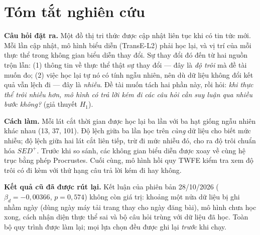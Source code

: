 \documentclass[12pt,a4paper,oneside]{report}
\makeatletter
\theoremstyle{definition}
\theoremstyle{plain}
\theoremstyle{remark}
\newif\if@mainmatter
\newcommand{\frontmatter}{%
    \cleardoublepage
    \@mainmatterfalse
    \pagenumbering{roman}
}
\makeatother
\begin{document}
\frontmatter

\chapter*{Tóm tắt nghiên cứu}
\textbf{Câu hỏi đặt ra.} Một đồ thị tri thức được cập nhật liên tục khi có tin tức mới. Mỗi lần cập nhật, mô hình biểu diễn (TransE-L2) phải học lại, và vị trí của mỗi thực thể trong không gian biểu diễn thay đổi. Sự thay đổi đó đến từ hai nguồn trộn lẫn: (1) thông tin về thực thể thật sự thay đổi --- đây là \textit{độ trôi} mà đề tài muốn đo; (2) việc học lại tự nó có tính ngẫu nhiên, nên dù dữ liệu không đổi kết quả vẫn lệch đi --- đây là \textit{nhiễu}. Đề tài muốn tách hai phần này, rồi hỏi: \textit{khi thực thể trôi nhiều hơn, mô hình có trả lời kém đi các câu hỏi cần suy luận qua nhiều bước không?} (giả thuyết $H_1$).

\textbf{Cách làm.} Mỗi lát cắt thời gian được học lại ba lần với ba hạt giống ngẫu nhiên khác nhau (13, 37, 101). Độ lệch giữa ba lần học trên \textit{cùng} dữ liệu cho biết mức nhiễu; độ lệch giữa hai lát cắt liên tiếp, trừ đi mức nhiễu đó, cho ra độ trôi chuẩn hóa $SED^+$. Trước khi so sánh, các không gian biểu diễn được xoay về cùng hệ trục bằng phép Procrustes. Cuối cùng, mô hình hồi quy TWFE kiểm tra xem độ trôi có đi kèm với thứ hạng câu trả lời kém đi hay không.

\textbf{Kết quả cũ đã được rút lại.} Kết luận của phiên bản 28/10/2026 ($\beta_d = -0{,}00366$, $p = 0{,}574$) không còn giá trị: khoảng một nửa dữ liệu bị ghi nhầm ngày (dùng ngày máy tải trang thay cho ngày đăng bài), mô hình chưa học xong, cách nhận diện thực thể sai và bộ câu hỏi trùng với dữ liệu đã học. Toàn bộ quy trình được làm lại; mọi lựa chọn đều được ghi lại \textit{trước} khi chạy.
\end{document}
